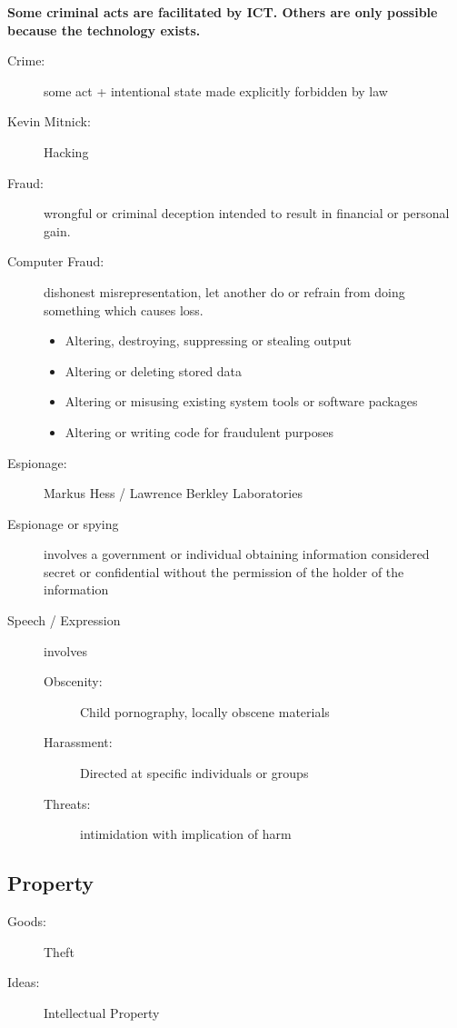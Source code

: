 \documentclass[a4paper]{article}
\begin{document}
\textbf{Some criminal acts are facilitated by ICT. Others are only possible because the technology exists.}

\begin{description}
\item[Crime:] some act + intentional state made explicitly forbidden by law
\item[Kevin Mitnick: ] Hacking
\item[Fraud:] wrongful or criminal deception intended to result in financial or personal gain.
\item[Computer Fraud:] dishonest misrepresentation, let another do or refrain from doing something which causes loss.
\begin{itemize}
\item Altering, destroying, suppressing or stealing output
\item Altering or deleting stored data
\item Altering or misusing existing system tools or software packages
\item Altering or writing code for fraudulent purposes
\end{itemize}
\item[Espionage:] Markus Hess / Lawrence Berkley Laboratories
\item[Espionage or spying] involves a government or individual obtaining information considered secret or confidential without the permission of the holder of the information
\item[Speech / Expression] involves
\begin{description}
\item[Obscenity:] Child pornography, locally obscene materials
\item[Harassment:] Directed at specific individuals or groups
\item[Threats:] intimidation with implication of harm
\end{description}
\end{description}

\subsection*{Property}

\begin{description}
\item[Goods:] Theft
\item[Ideas:] Intellectual Property
\end{description}
\end{document}
